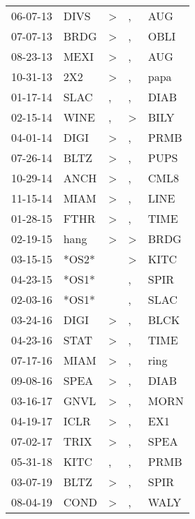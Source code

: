 \begin{supertabular}{lllll}
 06-07-13 &   DIVS &     \textgreater &             , &    AUG \\
 07-07-13 &   BRDG &     \textgreater &             , &   OBLI \\
 08-23-13 &   MEXI &     \textgreater &             , &    AUG \\
 10-31-13 &    2X2 &     \textgreater &             , &   papa \\
 01-17-14 &   SLAC &                , &             , &   DIAB \\
 02-15-14 &   WINE &                , &  \textgreater &   BILY \\
 04-01-14 &   DIGI &     \textgreater &             , &   PRMB \\
 07-26-14 &   BLTZ &     \textgreater &             , &   PUPS \\
 10-29-14 &   ANCH &     \textgreater &             , &   CML8 \\
 11-15-14 &   MIAM &     \textgreater &             , &   LINE \\
 01-28-15 &   FTHR &     \textgreater &             , &   TIME \\
 02-19-15 &   hang &     \textgreater &  \textgreater &   BRDG \\
 03-15-15 &  *OS2* &                  &  \textgreater &   KITC \\
 04-23-15 &  *OS1* &                  &             , &   SPIR \\
 02-03-16 &  *OS1* &                  &             , &   SLAC \\
 03-24-16 &   DIGI &     \textgreater &             , &   BLCK \\
 04-23-16 &   STAT &     \textgreater &             , &   TIME \\
 07-17-16 &   MIAM &     \textgreater &             , &   ring \\
 09-08-16 &   SPEA &     \textgreater &             , &   DIAB \\
 03-16-17 &   GNVL &     \textgreater &             , &   MORN \\
 04-19-17 &   ICLR &     \textgreater &             , &    EX1 \\
 07-02-17 &   TRIX &     \textgreater &             , &   SPEA \\
 05-31-18 &   KITC &                , &             , &   PRMB \\
 03-07-19 &   BLTZ &     \textgreater &             , &   SPIR \\
 08-04-19 &   COND &     \textgreater &             , &   WALY \\
\end{supertabular}
